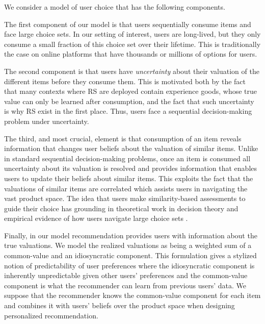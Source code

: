 \documentclass[manuscript]{acmart}
\newcommand{\xhdr}[1]{\vspace{1mm} \noindent{\bf #1}}
\begin{document}
\xhdr{Our Model} We consider a model of user choice that has the following components.
\par
The first component of our model is that users sequentially consume items and face large choice sets. In our setting of interest, users are long-lived, but they only consume a small fraction of this choice set over their lifetime. This is traditionally the case on online platforms that have thousands or millions of options for users.
\par
The second component is that users have \textit{uncertainty} about their valuation of the different items before they consume them. This is motivated both by the fact that many contexts where RS are deployed contain experience goods, whose true value can only be learned after consumption, and the fact that such uncertainty is why RS exist in the first place. Thus, users face a sequential decision-making problem under uncertainty.
\par 
The third, and most crucial, element is that consumption of an item reveals information that changes user beliefs about the valuation of similar items. Unlike in standard sequential decision-making problems, once an item is consumed all uncertainty about its valuation is resolved and provides information that enables users to update their beliefs about similar items. This exploits the fact that the valuations of similar items are correlated which assists users in navigating the vast product space. The idea that users make similarity-based assessments to guide their choice has grounding in theoretical work in decision theory \cite{gilboa1995case} and empirical evidence of how users navigate large choice sets \cite{schulz2019structured}.
\par 
Finally, in our model recommendation provides users with information about the true valuations. We model the realized valuations as being a weighted sum of a common-value and an idiosyncratic component. This formulation gives a stylized notion of predictability of user preferences where the idiosyncratic component is inherently unpredictable given other users' preferences and the common-value component is what the recommender can learn from previous users' data. We suppose that the recommender knows the common-value component for each item and combines it with users' beliefs over the product space when designing personalized recommendation.
\end{document}
